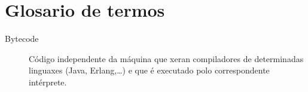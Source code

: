 \chapter{Glosario de termos}
\label{chap:glosario-termos}


\begin{description}
 \item [Bytecode] Código independente da máquina que xeran
   compiladores de determinadas linguaxes (Java, Erlang,\dots) e que
   é executado polo correspondente intérprete.
\end{description}
